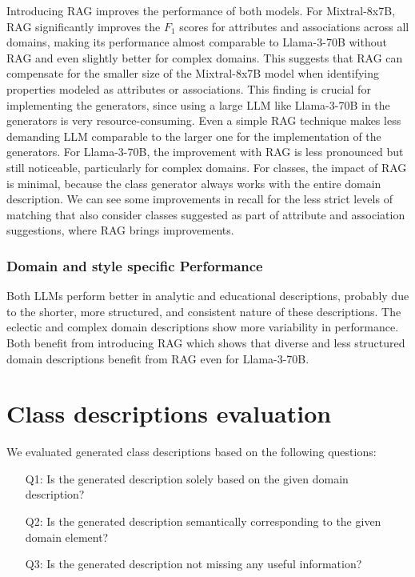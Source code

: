 Introducing RAG improves the performance of both models.
For Mixtral-8x7B, RAG significantly improves the $F_1$ scores for attributes and associations across all domains, making its performance almost comparable to Llama-3-70B without RAG and even slightly better for complex domains.
This suggests that RAG can compensate for the smaller size of the Mixtral-8x7B model when identifying properties modeled as attributes or associations.
This finding is crucial for implementing the generators, since using a large LLM like Llama-3-70B in the generators is very resource-consuming.
Even a simple RAG technique makes less demanding LLM comparable to the larger one for the implementation of the generators.
For Llama-3-70B, the improvement with RAG is less pronounced but still noticeable, particularly for complex domains.
For classes, the impact of RAG is minimal, because the class generator always works with the entire domain description.
We can see some improvements in recall for the less strict levels of matching that also consider classes suggested as part of attribute and association suggestions, where RAG brings improvements.


\subsubsection{Domain and style specific Performance}

Both LLMs perform better in analytic and educational descriptions, probably due to the shorter, more structured, and consistent nature of these descriptions.
The eclectic and complex domain descriptions show more variability in performance.
Both benefit from introducing RAG which shows that diverse and less structured domain descriptions benefit from RAG even for Llama-3-70B.


\section{Class descriptions evaluation}

We evaluated generated class descriptions based on the following questions:

\begin{enumerate}
\item [Q1:] Is the generated description solely based on the given domain description?
\item [Q2:] Is the generated description semantically corresponding to the given domain element?
\item [Q3:] Is the generated description not missing any useful information?
\end{enumerate}


